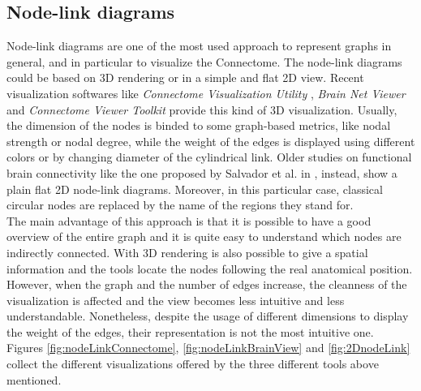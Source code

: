 \documentclass{article}
\begin{document}
\begin{multicols}{2}
\subsection{Node-link diagrams}
Node-link diagrams are one of the most used approach to represent graphs in general, and in particular to visualize the Connectome. The node-link diagrams could be based on 3D rendering or in a simple and flat 2D view. Recent visualization softwares like \textit{Connectome Visualization Utility} \cite{connectomeVisualizationUtility}, \textit{Brain Net Viewer} \cite{brainNetViewer} and \textit{Connectome Viewer Toolkit} \cite{connectomeViewer} provide this kind of 3D visualization. Usually, the dimension of the nodes is binded to some graph-based metrics, like nodal strength or nodal degree, while the weight of the edges is displayed using different colors or by changing diameter of the cylindrical link. Older studies on functional brain connectivity like the one proposed by Salvador et al. in \cite{salvador2005undirected}, instead, show a plain flat 2D node-link diagrams. Moreover, in this particular case, classical circular nodes are replaced by the name of the regions they stand for.\\ The main advantage of this approach is that it is possible to have a good overview of the entire graph and it is quite easy to understand which nodes are indirectly connected. With 3D rendering is also possible to give a spatial information and the tools locate the nodes following the real anatomical position. However, when the graph and the number of edges increase, the cleanness of the visualization is affected and the view becomes less intuitive and less understandable. Nonetheless, despite the usage of different dimensions to display the weight of the edges, their representation is not the most intuitive one. \\
Figures \ref{fig:nodeLinkConnectome}, \ref{fig:nodeLinkBrainView} and \ref{fig:2DnodeLink} collect the different visualizations offered by the three different tools above mentioned.



\end{multicols}
\end{document}
